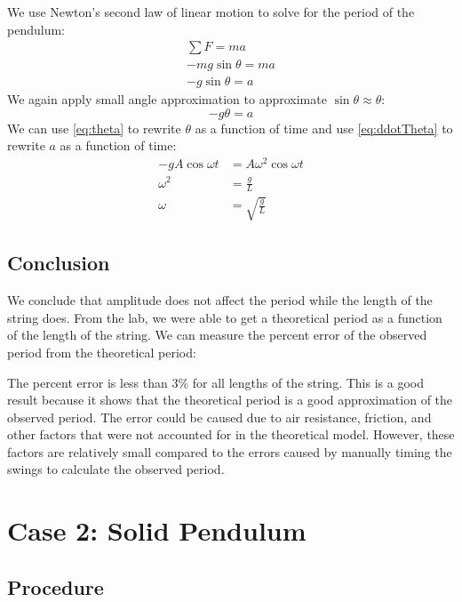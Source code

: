 \documentclass[article, 12pt]{article}
\begin{document}
\begin{enumerate}[1)]
    We use Newton's second law of linear motion to solve for the period of the pendulum:
    \begin{align}
        \sum F = ma \nonumber \\
        -mg\sin{\theta} = ma \nonumber \\
        -g\sin{\theta} = a
        \label{eq:forceEquality}
    \end{align}
    We again apply small angle approximation to approximate $\sin{\theta} \approx \theta$:
    \begin{equation}
        -g\theta = a
        \label{eq:forceSmallAngleApprox}
    \end{equation}
    We can use \autoref{eq:theta} to rewrite $\theta$ as a function of time and use \autoref{eq:ddotTheta} to rewrite $a$ as a function of time:
    \begin{align}
        -gA\cos{\omega t} &= A\omega^2\cos{\omega t} \nonumber \\
        \omega^2 &= \frac{g}{L} \nonumber \\
        \omega &= \sqrt{\frac{g}{L}}
        \label{eq:forceTheta}
    \end{align}
\end{enumerate}
\subsection{Conclusion}
We conclude that amplitude does not affect the period while the length of the string does. From the lab, we were able to get a theoretical period as a function of the length of the string. We can measure the percent error of the observed period from the theoretical period: 
\begin{table}[H]
    \centering
    \caption{Percent Error of Observed Period from Expected Period}
    \label{tab:percentError}
\end{table}
The percent error is less than 3\% for all lengths of the string. This is a good result because it shows that the theoretical period is a good approximation of the observed period. The error could be caused due to air resistance, friction, and other factors that were not accounted for in the theoretical model. However, these factors are relatively small compared to the errors caused by manually timing the swings to calculate the observed period.
\section{Case 2: Solid Pendulum}
\subsection{Procedure}
\end{document}

